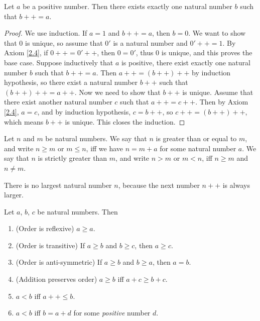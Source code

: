 \begin{lemma}\label{2.2.10}
    Let \(a\) be a positive number.
    Then there exists exactly one natural number \(b\) such that \(b++ = a\).
\end{lemma}

\begin{proof}
    We use induction.
    If \(a = 1\) and \(b++ = a\), then \(b = 0\).
    We want to show that \(0\) is unique, so assume that \(0'\) is a natural number and \(0'++ = 1\).
    By Axiom \ref{2.4}, if \(0++ = 0'++\), then \(0 = 0'\), thus \(0\) is unique, and this proves the base case.
    Suppose inductively that \(a\) is positive, there exist exactly one natural number \(b\) such that \(b++ = a\).
    Then \(a++ = (b++)++\) by induction hypothesis, so there exist a natural number \(b++\) such that \((b++)++ = a++\).
    Now we need to show that \(b++\) is unique.
    Assume that there exist another natural number \(c\) such that \(a++ = c++\).
    Then by Axiom \ref{2.4}, \(a = c\), and by induction hypothesis, \(c = b++\), so \(c++ = (b++)++\), which means \(b++\) is unique.
    This closes the induction.
\end{proof}

\begin{definition}\label{2.2.11}
    Let \(n\) and \(m\) be natural numbers.
    We say that \(n\) is greater than or equal to \(m\), and write \(n \geq m\) or \(m \leq n\), iff we have \(n = m + a\) for some natural number \(a\).
    We say that \(n\) is strictly greater than \(m\), and write \(n > m\) or \(m < n\), iff \(n \geq m\) and \(n \neq m\).
\end{definition}

\begin{note}
    There is no largest natural number \(n\), because the next number \(n++\) is always larger.
\end{note}

\begin{proposition}\label{2.2.12}
    Let \(a\), \(b\), \(c\) be natural numbers.
    Then
    \begin{enumerate}
        \item (Order is reflexive) \(a \geq a\).
        \item (Order is transitive) If \(a \geq b\) and \(b \geq c\), then \(a \geq c\).
        \item (Order is anti-symmetric) If \(a \geq b\) and \(b \geq a\), then \(a = b\).
        \item (Addition preserves order) \(a \geq b\) iff \(a + c \geq b + c\).
        \item \(a < b\) iff \(a++ \leq b\).
        \item \(a < b\) iff \(b = a + d\) for some \emph{positive} number \(d\).
    \end{enumerate}
\end{proposition}


